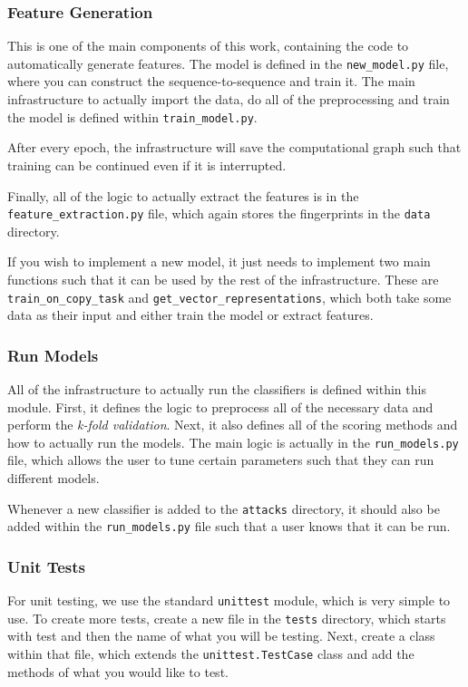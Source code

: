 \subsubsection{Feature Generation}

This is one of the main components of this work, containing the code to automatically generate features.
The model is defined in the \texttt{new\_model.py} file, where you can construct the sequence-to-sequence and train it.
The main infrastructure to actually import the data, do all of the preprocessing and train the model is defined within \texttt{train\_model.py}.

After every epoch, the infrastructure will save the computational graph such that training can be continued even if it is interrupted.

Finally, all of the logic to actually extract the features is in the \texttt{feature\_extraction.py} file, which again stores the fingerprints in the \texttt{data} directory.

If you wish to implement a new model, it just needs to implement two main functions such that it can be used by the rest of the infrastructure.
These are \texttt{train\_on\_copy\_task} and \texttt{get\_vector\_representations}, which both take some data as their input and either train the model or extract features.

\subsubsection{Run Models}

All of the infrastructure to actually run the classifiers is defined within this module.
First, it defines the logic to preprocess all of the necessary data and perform the \textit{k-fold validation}.
Next, it also defines all of the scoring methods and how to actually run the models.
The main logic is actually in the \texttt{run\_models.py} file, which allows the user to tune certain parameters such that they can run different models.

Whenever a new classifier is added to the \texttt{attacks} directory, it should also be added within the \texttt{run\_models.py} file such that a user knows that it can be run.

\subsubsection{Unit Tests}

For unit testing, we use the standard \texttt{unittest} module, which is very simple to use.
To create more tests, create a new file in the \texttt{tests} directory, which starts with test and then the name of what you will be testing.
Next, create a class within that file, which extends the \texttt{unittest.TestCase} class and add the methods of what you would like to test.

